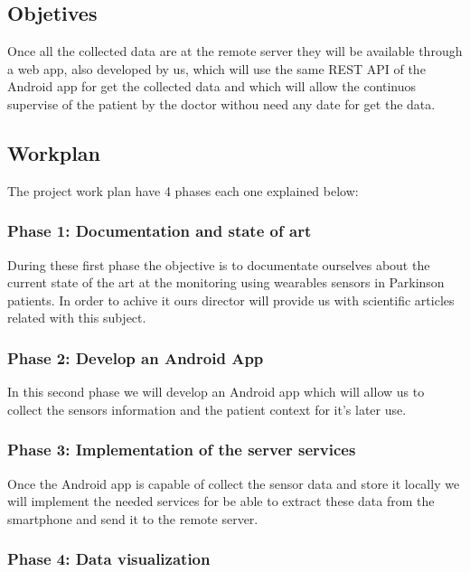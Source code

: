 \documentclass[11pt,spanish]{article}
\begin{document}
\subsection{Objetives}

Once all the collected data are at the remote server they will be available through a web app, also developed by us, which will use the same REST API of the Android app for get the collected data and which will allow the continuos supervise of the patient by the doctor withou need any date for get the data.
\newline

\subsection{Workplan}

The project work plan have 4 phases each one explained below:

\subsubsection{Phase 1: Documentation and state of art}

During these first phase the objective is to documentate ourselves about the current state of the art at the monitoring using wearables sensors in Parkinson patients. In order to achive it ours director will provide us with scientific articles related with this subject.

\subsubsection{Phase 2: Develop an Android App}

In this second phase we will develop an Android app which will allow us to collect the sensors information and the patient context for it's later use.

\subsubsection{Phase 3: Implementation of the server services}

Once the Android app is capable of collect the sensor data and store it locally we will implement the needed services for be able to extract these data from the smartphone and send it to the remote server.

\subsubsection{Phase 4: Data visualization}
\end{document}
